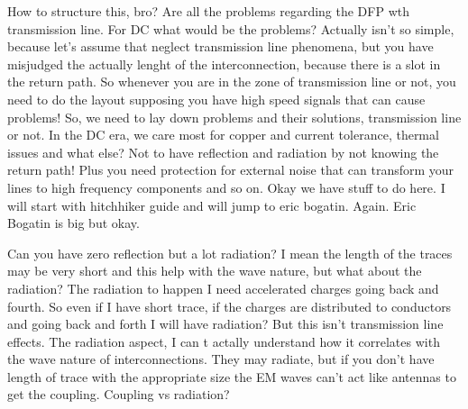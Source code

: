 \documentclass[12pt]{article}
\begin{document}
How to structure this, bro? Are all the problems regarding the DFP wth transmission line. For DC what would be the problems? Actually isn't so simple, because let's assume that neglect transmission line phenomena, but you have misjudged the actually lenght of the interconnection, because there is a slot in the return path. So whenever you are in the zone of transmission line or not, you need to do the layout supposing you have high speed signals that can cause problems! So, we need to lay down problems and their solutions, transmission line or not. In the DC era, we care most for copper and current tolerance, thermal issues and what else? Not to have reflection and radiation by not knowing the return path! Plus you need protection for external noise that can transform your lines to high frequency components and so on. Okay we have stuff to do here. I will start with hitchhiker guide and will jump to eric bogatin. Again. Eric Bogatin is big but okay.

Can you have zero reflection but a lot radiation? I mean the length of the traces may be very short and this help with the wave nature, but what about the radiation? The radiation to happen I need accelerated charges going back and fourth. So even if I have short trace, if the charges are distributed to conductors and going back and forth I will have radiation? But this isn't transmission line effects. The radiation aspect, I can t actally understand how it correlates with the wave nature of interconnections. They may radiate, but if you don't have length of trace with the appropriate size the EM waves can't act like antennas to get the coupling. Coupling vs radiation?
\end{document}
